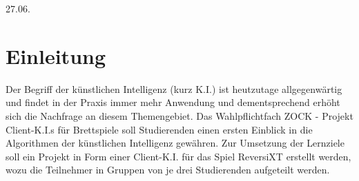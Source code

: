 \documentclass[12pt,a4paper,bibliography=totocnumbered,listof=totocnumbered]{article}
\begin{document}
{27.06.\the\year}

\setcounter{page}{1} 
\tableofcontents
\pagebreak



\renewcommand{\sectionmark}[1]{\markright{#1}}
\renewcommand{\subsectionmark}[1]{}
\renewcommand{\subsubsectionmark}[1]{}
\rhead{\rightmark}

\onehalfspacing
\renewcommand{\thesection}{\arabic{section}}
\renewcommand{\theHsection}{\arabic{section}}
\setcounter{section}{0}
\setcounter{page}{1}

\section{Einleitung} \label{kap:Einleitung}
Der Begriff der \glqq künstlichen Intelligenz\grqq{} (kurz K.I.) ist heutzutage allgegenwärtig und findet in der Praxis immer mehr Anwendung und dementsprechend erhöht sich die Nachfrage an diesem Themengebiet.
Das Wahlpflichtfach \glqq ZOCK - Projekt Client-K.I.s für Brettspiele\grqq{} soll Studierenden einen ersten Einblick in die Algorithmen der künstlichen Intelligenz gewähren. Zur Umsetzung der Lernziele soll ein Projekt in Form einer Client-K.I. für das Spiel ReversiXT erstellt werden, wozu die Teilnehmer in Gruppen von je drei Studierenden aufgeteilt werden. 
\end{document}
